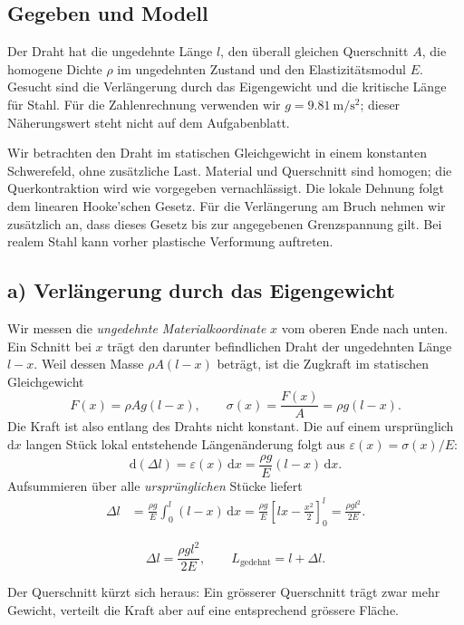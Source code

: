 
\subsection*{Gegeben und Modell}
Der Draht hat die ungedehnte Länge $l$, den überall gleichen Querschnitt $A$,
die homogene Dichte $\rho$ im ungedehnten Zustand und den Elastizitätsmodul
$E$. Gesucht sind die Verlängerung durch das Eigengewicht und die kritische
Länge für Stahl. Für die Zahlenrechnung verwenden wir
$g=\qty{9.81}{\metre\per\second\squared}$; dieser Näherungswert steht nicht
auf dem Aufgabenblatt.

Wir betrachten den Draht im statischen Gleichgewicht in einem konstanten
Schwerefeld, ohne zusätzliche Last. Material und Querschnitt sind homogen;
die Querkontraktion wird wie vorgegeben vernachlässigt. Die lokale Dehnung
folgt dem linearen Hooke'schen Gesetz. Für die Verlängerung am Bruch nehmen
wir zusätzlich an, dass dieses Gesetz bis zur angegebenen Grenzspannung gilt.
Bei realem Stahl kann vorher plastische Verformung auftreten.

\subsection*{a) Verlängerung durch das Eigengewicht}
Wir messen die \emph{ungedehnte Materialkoordinate} $x$ vom oberen Ende nach
unten. Ein Schnitt bei $x$ trägt den darunter befindlichen Draht der
ungedehnten Länge $l-x$. Weil dessen Masse $\rho A(l-x)$ beträgt, ist die
Zugkraft im statischen Gleichgewicht
\begin{equation}
  F(x)=\rho A g(l-x), \qquad
  \sigma(x)=\frac{F(x)}{A}=\rho g(l-x).
\end{equation}
Die Kraft ist also entlang des Drahts nicht konstant. Die auf einem
ursprünglich $\mathrm dx$ langen Stück lokal entstehende Längenänderung folgt
aus $\varepsilon(x)=\sigma(x)/E$:
\begin{equation}
  \mathrm d(\Delta l)=\varepsilon(x)\,\mathrm dx
  =\frac{\rho g}{E}(l-x)\,\mathrm dx.
\end{equation}
Aufsummieren über alle \emph{ursprünglichen} Stücke liefert
\begin{align}
  \Delta l
    &=\frac{\rho g}{E}\int_0^l(l-x)\,\mathrm dx
      =\frac{\rho g}{E}\left[lx-\frac{x^2}{2}\right]_0^l
      =\frac{\rho g l^2}{2E}.
\end{align}
\begin{ergebnis}[a) Verlängerung]
\begin{equation*}
  \boxed{\Delta l=\frac{\rho g l^2}{2E}}, \qquad
  L_{\mathrm{gedehnt}}=l+\Delta l.
\end{equation*}
\end{ergebnis}
Der Querschnitt kürzt sich heraus: Ein grösserer Querschnitt trägt zwar mehr
Gewicht, verteilt die Kraft aber auf eine entsprechend grössere Fläche.

